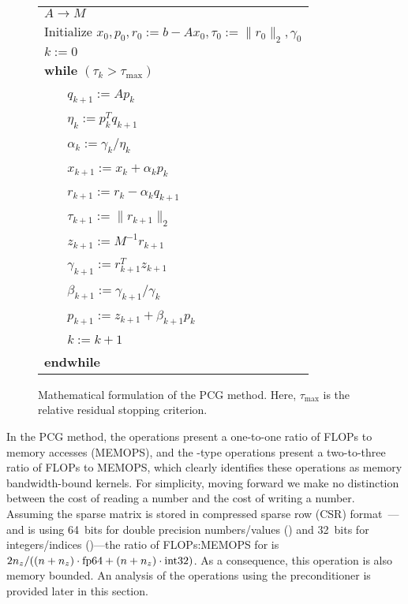 \begin{figure}[thb]
{\small
\begin{center}
\begin{tabular}{|l|}
\hline
  $A \rightarrow M$  
\\Initialize $x_0, p_0, r_0 := b-Ax_0, \tau_0 := \parallel r_{0}\parallel_2, 
\gamma_0$
\\ $k := 0$                                                
\\ {\bf while} $(\tau_{k} > \tau_{\max})$   
\\ ~~~ $q_{k+1}:=Ap_{k}$                        
\\ ~~~ $\eta_k:=p_{k}^Tq_{k+1}$    
\\ ~~~ $\alpha_k:=\gamma_k/\eta_k$    
\\ ~~~ $x_{k+1}:=x_k+\alpha_k p_{k}$           
\\ ~~~ $r_{k+1}:=r_k-\alpha_k q_{k+1}$            
\\ ~~~ $\tau_{k+1}:=\parallel r_{k+1}\parallel_2 $  
\\ ~~~ $z_{k+1}:=M^{-1} r_{k+1}$            
\\ ~~~ $\gamma_{k+1}:= r_{k+1}^T z_{k+1}$    
\\ ~~~ $\beta_{k+1}:=\gamma_{k+1}/\gamma_{k}$  
\\ ~~~ $p_{k+1}:= z_{k+1} + \beta_{k+1} p_k$ 

\\ ~~~ $k:=k+1$   
\\ {\bf endwhile}  
\\\hline
\end{tabular}
\end{center}
}
\caption{Mathematical formulation of the PCG method. Here, $\tau_{\max}$ is
the relative residual stopping criterion.}
\label{2017-adaptive-block-jacobi:fig:pcg}
\end{figure}

In the PCG method, the \dotp operations present a
one-to-one ratio
of FLOPs to memory accesses (MEMOPS), and the \axpy-type operations present a 
two-to-three ratio of FLOPs to MEMOPS, which clearly identifies these 
operations as 
memory bandwidth-bound kernels. For simplicity, moving forward we make no 
distinction between 
the cost of reading a number and the cost of writing a number. Assuming the 
sparse 
matrix is stored in compressed sparse row (CSR) format~\cite{saad}---and is 
using 64~bits for double precision numbers/values (\fpd) and 32~bits for 
integers/indices (\inti)---the 
ratio of FLOPs:MEMOPS for \spmv is $2n_z/((n+n_z) \cdot \mbox{\rm fp64} + (n+n_z) \cdot
\mbox{\rm int32})$. As a consequence,
this operation is also memory bounded.
An analysis of the operations using the preconditioner is provided later
in this section.

